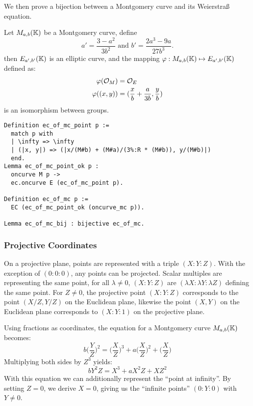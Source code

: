 We then prove a bijection between a Montgomery curve and its Weierstra{\ss} equation.
\begin{lemma}
  Let $M_{a,b}(\mathbb{K})$ be a Montgomery curve, define $$a' = \frac{3-a^2}{3b^2} \text{\ \ \ \ and\ \ \ \ } b' = \frac{2a^3 - 9a}{27b^3}.$$
  then $E_{a',b'}(\mathbb{K})$ is an elliptic curve, and the mapping $\varphi : M_{a,b}(\mathbb{K}) \mapsto E_{a',b'}(\mathbb{K})$ defined as:
  \begin{align*}
    \varphi(\mathcal{O}_M) &= \mathcal{O}_E\\
    \varphi( (x , y) ) &= ( \frac{x}{b} + \frac{a}{3b} , \frac{y}{b} )
  \end{align*}
  is an isomorphism between groups.
\end{lemma}
\begin{lstlisting}[language=Coq]
Definition ec_of_mc_point p :=
  match p with
  | \infty => \infty
  | (|x, y|) => (|x/(M#b) + (M#a)/(3%:R * (M#b)), y/(M#b)|)
  end.
Lemma ec_of_mc_point_ok p :
  oncurve M p ->
  ec.oncurve E (ec_of_mc_point p).

Definition ec_of_mc p :=
  EC (ec_of_mc_point_ok (oncurve_mc p)).

Lemma ec_of_mc_bij : bijective ec_of_mc.
\end{lstlisting}

\subsubsection{Projective Coordinates}
\label{subsec:ECC-projective}

On a projective plane, points are represented with a triple $(X:Y:Z)$.
With the exception of $(0:0:0)$, any points can be projected.
Scalar multiples are representing the same point, \ie
for all $\lambda \neq 0$, $(X:Y:Z)$ are $(\lambda X:\lambda Y:\lambda Z)$ defining
the same point.
For $Z\neq 0$, the projective point $(X:Y:Z)$ corresponds to the
point $(X/Z,Y/Z)$ on the Euclidean plane, likewise the point $(X,Y)$ on the
Euclidean plane corresponds to $(X:Y:1)$ on the projective plane.

Using fractions as coordinates, the equation for a Montgomery curve $M_{a,b}(\mathbb{K})$
becomes:
$$b \bigg(\frac{Y}{Z}\bigg)^2 = \bigg(\frac{X}{Z}\bigg)^3 + a \bigg(\frac{X}{Z}\bigg)^2 + \bigg(\frac{X}{Z}\bigg)$$
Multiplying both sides by $Z^3$ yields:
$$b Y^2Z = X^3 + a X^2Z + XZ^2$$
With this equation we can additionally represent the ``point at infinity''. By
setting $Z=0$, we derive $X=0$, giving us the ``infinite points'' $(0:Y:0)$ with $Y\neq 0$.

